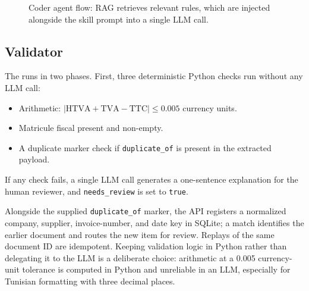 \begin{figure}[ht]
\centering
{}
\caption{Coder agent flow: RAG retrieves relevant rules, which are injected
alongside the skill prompt into a single LLM call.}
\label{fig:coder_flow}
\end{figure}

\subsection{Validator}

The  runs in two phases. First, three deterministic Python checks
run without any LLM call:
\begin{itemize}[leftmargin=*, itemsep=1pt]
  \item Arithmetic: $|\text{HTVA} + \text{TVA} - \text{TTC}| \leq 0.005$ currency units.
  \item Matricule fiscal present and non-empty.
  \item A duplicate marker check if \texttt{duplicate\_of} is present in the extracted payload.
\end{itemize}
If any check fails, a single LLM call generates a one-sentence explanation for
the human reviewer, and \texttt{needs\_review} is set to \texttt{true}.

Alongside the supplied \texttt{duplicate\_of} marker, the API registers a
normalized company, supplier, invoice-number, and date key in SQLite; a match
identifies the earlier document and routes the new item for review. Replays of
the same document ID are idempotent. Keeping validation logic in Python rather than delegating it to the LLM is a
deliberate choice: arithmetic at a 0.005 currency-unit tolerance is computed in Python and
unreliable in an LLM, especially for Tunisian formatting with three decimal places.

